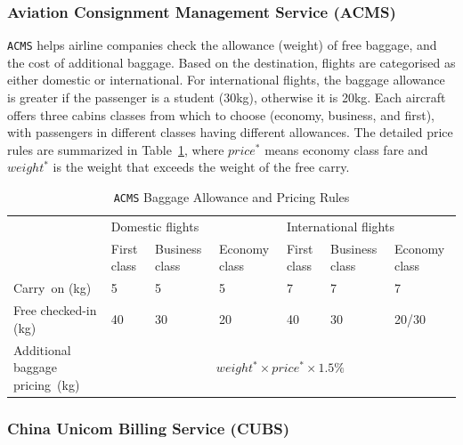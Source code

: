 \documentclass[10pt,journal,compsoc]{IEEEtran}
\begin{document}
\subsubsection{Aviation Consignment Management Service (ACMS)}
\label{sec:acms}

\texttt{ACMS} helps airline companies check the allowance (weight) of free baggage, and the cost of additional baggage.
Based on the destination, flights are categorised as either domestic or international.
For international flights, the baggage allowance is greater if the passenger is a student (30kg), otherwise it is 20kg.
Each aircraft offers three cabins classes from which to choose (economy, business, and first), with passengers in different classes having different allowances.
The detailed price rules are summarized in Table~\ref{tab:aviation}, where $price^*$ means economy class fare and $weight^*$ is the weight that exceeds the weight of the free carry.
\begin{table}
  \caption{\texttt{ACMS} Baggage Allowance and Pricing Rules}
  \label{tab:aviation}
  \centering
  \begin{tabular}{lllllll} \toprule
  \multirow{2}{*}{}     &\multicolumn{3}{l}{Domestic flights} &\multicolumn{3}{l}{International flights} \\ \cmidrule(lr){2-4} \cmidrule(lr){5-7}
                       &First class  &Business class   &Economy class   &First class  &Business class   &Economy class \\ \midrule
  Carry~on (kg)   &5       &5        &5        &7        &7        &7  \\
  Free checked-in (kg)   &40      &30       &20       &40       &30       &20/30 \\
  Additional baggage pricing~(kg)   &\multicolumn{6}{c}{$weight^* \times price^* \times 1.5\%$}     \\ \bottomrule
  \end{tabular}
\end{table}

\subsubsection{China Unicom Billing Service (CUBS)}
\label{sec:cubs}
\end{document}
